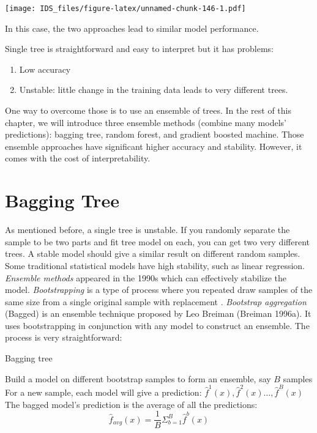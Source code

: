 \documentclass[
  12pt,
]{krantz}
\providecommand{\tightlist}{%
  \setlength{\itemsep}{0pt}\setlength{\parskip}{0pt}}
\begin{document}
\texttt{[image: IDS\_files/figure-latex/unnamed-chunk-146-1.pdf]}

In this case, the two approaches lead to similar model performance.

Single tree is straightforward and easy to interpret but it has problems:

\begin{enumerate}
\def\labelenumi{\arabic{enumi}.}
\tightlist
\item
  Low accuracy
\item
  Unstable: little change in the training data leads to very different trees.
\end{enumerate}

One way to overcome those is to use an ensemble of trees. In the rest of this chapter, we will introduce three ensemble methods (combine many models' predictions): bagging tree, random forest, and gradient boosted machine. Those ensemble approaches have significant higher accuracy and stability. However, it comes with the cost of interpretability.

\hypertarget{bagging-tree-1}{%
\section{Bagging Tree}\label{bagging-tree-1}}

As mentioned before, a single tree is unstable. If you randomly separate the sample to be two parts and fit tree model on each, you can get two very different trees. A stable model should give a similar result on different random samples. Some traditional statistical models have high stability, such as linear regression. \emph{Ensemble methods} appeared in the 1990s which can effectively stabilize the model. \emph{Bootstrapping} is a type of process where you repeated draw samples of the same size from a single original sample with replacement \citep{Efron1986}. \emph{Bootstrap aggregation} (Bagged) is an ensemble technique proposed by Leo Breiman (Breiman 1996a). It uses bootstrapping in conjunction with any model to construct an ensemble. The process is very straightforward:

\begin{algorithm}
\caption{Bagging tree}\label{baggingtreealgorithm} 
\begin{algorithmic}[1] 
\State Build a model on different bootstrap samples to form an ensemble, say $B$ samples
\State For a new sample, each model will give a prediction: $\hat{f}^1(x),\hat{f}^2(x)\dots,\hat{f}^B(x)$
\State The bagged model's prediction is the average of all the predictions: $$\hat{f}_{avg}(x)=\frac{1}{B}\Sigma^B_{b=1}\hat{f}^b(x)$$
\end{algorithmic}
\end{algorithm}
\end{document}
